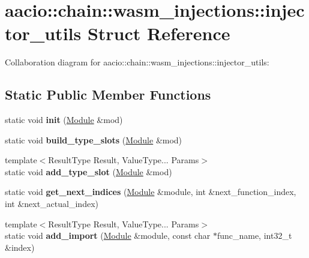 \hypertarget{structaacio_1_1chain_1_1wasm__injections_1_1injector__utils}{}\section{aacio\+:\+:chain\+:\+:wasm\+\_\+injections\+:\+:injector\+\_\+utils Struct Reference}
\label{structaacio_1_1chain_1_1wasm__injections_1_1injector__utils}


Collaboration diagram for aacio\+:\+:chain\+:\+:wasm\+\_\+injections\+:\+:injector\+\_\+utils\+:
\subsection*{Static Public Member Functions}
\begin{DoxyCompactItemize}
\item 
\mbox{\label{structaacio_1_1chain_1_1wasm__injections_1_1injector__utils_a0a62fa5869592b1ee71e05d4b1850cfd}} 
static void {\bfseries init} (\mbox{\hyperlink{struct_i_r_1_1_module}{Module}} \&mod)
\item 
\mbox{\label{structaacio_1_1chain_1_1wasm__injections_1_1injector__utils_afbe1bacb8cb3a4ad55447a88742e5133}} 
static void {\bfseries build\+\_\+type\+\_\+slots} (\mbox{\hyperlink{struct_i_r_1_1_module}{Module}} \&mod)
\item 
\mbox{\label{structaacio_1_1chain_1_1wasm__injections_1_1injector__utils_a59dca54dcd14443c066c4717f42a7cf1}} 
{\footnotesize template$<$Result\+Type Result, Value\+Type... Params$>$ }\\static void {\bfseries add\+\_\+type\+\_\+slot} (\mbox{\hyperlink{struct_i_r_1_1_module}{Module}} \&mod)
\item 
\mbox{\label{structaacio_1_1chain_1_1wasm__injections_1_1injector__utils_a3e5af64796a9d08c6fd96ead3f89eff6}} 
static void {\bfseries get\+\_\+next\+\_\+indices} (\mbox{\hyperlink{struct_i_r_1_1_module}{Module}} \&module, int \&next\+\_\+function\+\_\+index, int \&next\+\_\+actual\+\_\+index)
\item 
\mbox{\label{structaacio_1_1chain_1_1wasm__injections_1_1injector__utils_a6c3f10b3abeee745ad1ff2eeefcad933}} 
{\footnotesize template$<$Result\+Type Result, Value\+Type... Params$>$ }\\static void {\bfseries add\+\_\+import} (\mbox{\hyperlink{struct_i_r_1_1_module}{Module}} \&module, const char $\ast$func\+\_\+name, int32\+\_\+t \&index)
\end{DoxyCompactItemize}
